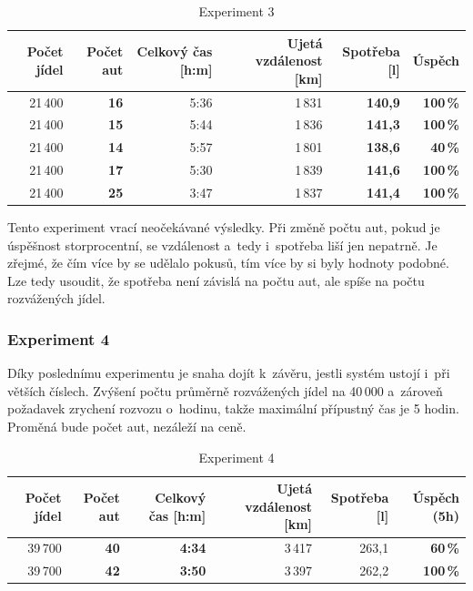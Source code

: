 \documentclass[a4paper, 11pt]{article}
\begin{document}
	\begin{table}[ht]
		\centering
		\begin{tabular}{|r|r|r|r|r|r|}
			\hline
			Počet jídel & \textbf{Počet aut} & Celkový čas [h:m]
				& Ujetá vzdálenost [km] & \textbf{Spotřeba [l]}
				& \textbf{Úspěch} \\ \hline

			21\,400 & \textbf{16} & 5:36 & 1\,831 & \textbf{140,9}
				& \textbf{100\,\%} \\ \hline

			21\,400 & \textbf{15} & 5:44 & 1\,836 & \textbf{141,3}
				& \textbf{100\,\%} \\ \hline

			21\,400 & \textbf{14} & 5:57 & 1\,801 & \textbf{138,6}
				& \textbf{40\,\%}  \\ \hline

			21\,400 & \textbf{17} & 5:30 & 1\,839 & \textbf{141,6}
				& \textbf{100\,\%} \\ \hline

			21\,400 & \textbf{25} & 3:47 & 1\,837 & \textbf{141,4}
				& \textbf{100\,\%} \\ \hline
		\end{tabular}

		\caption{Experiment 3}
		\label{table:experiment3}
	\end{table}

	Tento experiment vrací neočekávané výsledky. Při změně počtu aut, pokud je
	úspěšnost storprocentní, se vzdálenost a~tedy i~spotřeba liší jen nepatrně.
	Je zřejmé, že čím více by se udělalo pokusů, tím více by si byly hodnoty
	podobné. Lze tedy usoudit, že spotřeba není závislá na počtu aut, ale
	spíše na počtu rozvážených jídel.

	\subsubsection{Experiment 4}
	\label{section:experiment4}

	Díky poslednímu experimentu je snaha dojít k~závěru, jestli systém ustojí
	i~při větších číslech. Zvýšení počtu průměrně rozvážených jídel na 40\,000
	a~zároveň požadavek zrychení rozvozu o~hodinu, takže maximální přípustný
	čas je 5 hodin. Proměná bude počet aut, nezáleží na ceně.

	\begin{table}[ht]
		\centering
		\begin{tabular}{|r|r|r|r|r|r|}
			\hline
			Počet jídel & \textbf{Počet aut} & \textbf{Celkový čas [h:m]}
				& Ujetá vzdálenost [km] & Spotřeba [l]
				& \textbf{Úspěch (5h)} \\ \hline

			39\,700 & \textbf{40} & \textbf{4:34} & 3\,417 & 263,1
				& \textbf{60\,\%} \\ \hline

			39\,700 & \textbf{42} & \textbf{3:50} & 3\,397 & 262,2
				& \textbf{100\,\%} \\ \hline
		\end{tabular}

		\caption{Experiment 4}
		\label{table:experiment4}
	\end{table}
\end{document}
